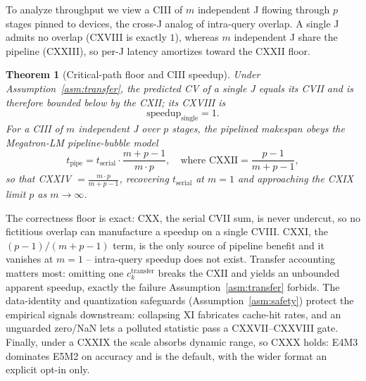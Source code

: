 \documentclass{article}
\newtheorem{theorem}{Theorem}
\begin{document}
To analyze throughput we view a CIII of $m$ independent J flowing through $p$
stages pinned to devices, the cross-J analog of intra-query overlap. A single J
admits no overlap (CXVIII is exactly $1$), whereas $m$ independent J share the
pipeline (CXXIII), so per-J latency amortizes toward the CXXII floor.

\begin{theorem}[Critical-path floor and CIII speedup]
\label{thm:costmodel}
Under Assumption~\ref{asm:transfer}, the predicted CV of a single J equals its
CVII and is therefore bounded below by the CXII; its CXVIII is
\begin{equation}
\text{speedup}_{\text{single}} = 1.
\end{equation}
For a CIII of $m$ independent J over $p$ stages, the pipelined makespan obeys the
Megatron-LM pipeline-bubble model
\begin{equation}
t_{\text{pipe}} = t_{\text{serial}} \cdot \frac{m + p - 1}{m \cdot p}, \quad \text{where } \mathrm{CXXII} = \frac{p-1}{m+p-1},
\end{equation}
so that CXXIV $= \frac{m \cdot p}{m + p - 1}$, recovering $t_{\text{serial}}$ at
$m=1$ and approaching the CXIX limit $p$ as $m \to \infty$.
\end{theorem}

The correctness floor is exact: CXX, the serial CVII sum, is never undercut, so
no fictitious overlap can manufacture a speedup on a single CVIII.
CXXI, the $(p-1)/(m+p-1)$ term, is the only source of pipeline benefit and it
vanishes at $m=1$ -- intra-query speedup does not exist. Transfer accounting
matters most: omitting one $c^{\text{transfer}}_k$ breaks the CXII and yields an
unbounded apparent speedup, exactly the failure Assumption~\ref{asm:transfer}
forbids. The data-identity and quantization safeguards
(Assumption~\ref{asm:safety}) protect the empirical signals downstream:
collapsing XI fabricates cache-hit rates, and an unguarded zero/NaN lets a
polluted statistic pass a CXXVII--CXXVIII gate. Finally, under a CXXIX the scale
absorbs dynamic range, so CXXX holds: E4M3 dominates E5M2 on accuracy and is the
default, with the wider format an explicit opt-in only.

\end{document}
